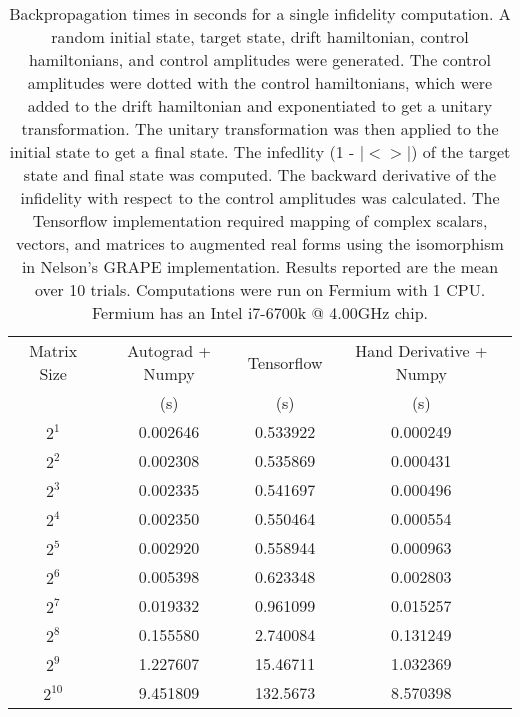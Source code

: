 \documentclass[letterpaper, 12pt]{article}
\begin{document}
\begin{table}
  \begin{center}
    \begin{tabular}{c | c | c | c}
      Matrix Size & Autograd + Numpy & Tensorflow & Hand Derivative + Numpy\\
                  & (s)              & (s)        & (s)\\
      \hline
      $2^{1}$  & 0.002646            & 0.533922 & 0.000249\\
      $2^{2}$  & 0.002308            & 0.535869 & 0.000431\\
      $2^{3}$  & 0.002335            & 0.541697 & 0.000496\\
      $2^{4}$  & 0.002350            & 0.550464 & 0.000554\\
      $2^{5}$  & 0.002920            & 0.558944 & 0.000963\\
      $2^{6}$  & 0.005398            & 0.623348 & 0.002803\\
      $2^{7}$  & 0.019332            & 0.961099 & 0.015257\\
      $2^{8}$  & 0.155580            & 2.740084 & 0.131249\\
      $2^{9}$  & 1.227607            & 15.46711 & 1.032369\\
      $2^{10}$ & 9.451809            & 132.5673 & 8.570398\\
    \end{tabular}
  \end{center}
  \caption{Backpropagation times in seconds for a single infidelity computation. A random initial state, target state, drift hamiltonian, control hamiltonians, and control amplitudes were generated. The control amplitudes were dotted with the control hamiltonians, which were added to the drift hamiltonian and exponentiated to get a unitary transformation. The unitary transformation was then applied to the initial state to get a final state. The infedlity (1 - $|<>|$) of the target state and final state was computed. The backward derivative of the infidelity with respect to the control amplitudes was calculated. The Tensorflow implementation required mapping of complex scalars, vectors, and matrices to augmented real forms using the isomorphism in Nelson's GRAPE implementation. Results reported are the mean over 10 trials. Computations were run on Fermium with 1 CPU. Fermium has an Intel i7-6700k @ 4.00GHz chip.}
\end{table}
\end{document}
